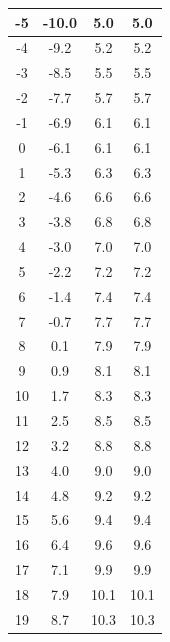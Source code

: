 \begin{longtable}{|c|c|c|c|}
                \hline
                -5 & -10.0 & 5.0 & 5.0 \\
                \hline
                -4 & -9.2 & 5.2 & 5.2 \\
                \hline
                -3 & -8.5 & 5.5 & 5.5 \\
                \hline
                -2 & -7.7 & 5.7 & 5.7 \\
                \hline
                -1 & -6.9 & 6.1 & 6.1 \\
                \hline
                0 & -6.1 & 6.1 & 6.1 \\
                \hline
                1 & -5.3 & 6.3 & 6.3 \\
                \hline
                2 & -4.6 & 6.6 & 6.6 \\
                \hline
                3 & -3.8 & 6.8 & 6.8 \\
                \hline
                4 & -3.0 & 7.0 & 7.0 \\
                \hline
                5 & -2.2 & 7.2 & 7.2 \\
                \hline
                6 & -1.4 & 7.4 & 7.4 \\
                \hline
                7 & -0.7 & 7.7 & 7.7 \\
                \hline
                8 & 0.1 & 7.9 & 7.9 \\
                \hline
                9 & 0.9 & 8.1 & 8.1 \\
                \hline
                10 & 1.7 & 8.3 & 8.3 \\
                \hline
                11 & 2.5 & 8.5 & 8.5 \\
                \hline
                12 & 3.2 & 8.8 & 8.8 \\
                \hline
                13 & 4.0 & 9.0 & 9.0 \\
                \hline
                14 & 4.8 & 9.2 & 9.2 \\
                \hline
                15 & 5.6 & 9.4 & 9.4 \\
                \hline
                16 & 6.4 & 9.6 & 9.6 \\
                \hline
                17 & 7.1 & 9.9 & 9.9 \\
                \hline
                18 & 7.9 & 10.1 & 10.1 \\
                \hline
                19 & 8.7 & 10.3 & 10.3 \\
                \hline

\end{longtable}
